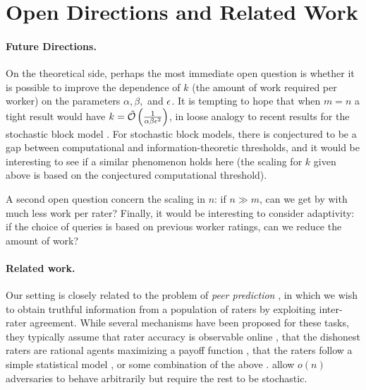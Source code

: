 \section{Open Directions and Related Work}
\label{sec:discussion}
\iffalse
\todo{fill in with lower bounds and conjectures that explain what 
``best possible'' result would look like, and how adversarial and 
stochastic settings compare}\fi

\paragraph{Future Directions.}
On the theoretical side, perhaps the most immediate open question is whether it is 
possible to improve the dependence of $k$ (the amount of work required per worker) 
on the parameters $\alpha, \beta,$ and $\epsilon$.  It is tempting to hope that 
when $m = n$ a tight result would have 
$k = \tilde{\mathcal{O}}\left( \tfrac{1}{\alpha\beta\epsilon^2} \right)$, in loose analogy
to recent results for the stochastic block model . 
For stochastic block models, there is conjectured to be a gap between 
computational and information-theoretic thresholds, and it would be 
interesting to see if a similar phenomenon holds here (the scaling for 
$k$ given above is based on the conjectured computational threshold).

A second open question concern the scaling in $n$:
if $n \gg m$, can we get by with much less work per rater?
Finally, it would be interesting to consider adaptivity: if 
the choice of queries is based on previous worker ratings, 
can we reduce the amount of work?


\paragraph{Related work.}
Our setting is closely related to the problem of \emph{peer prediction} 
, in which we wish to obtain truthful information 
from a population of raters by exploiting inter-rater agreement. 
While several mechanisms have been proposed for these tasks, 
they typically assume that rater accuracy is observable online
, that the dishonest raters are 
rational agents maximizing a payoff function , that the raters follow a simple 
statistical model , or some combination of the above . 
 allow $o(n)$ adversaries 
to behave arbitrarily but require the rest to be stochastic.


